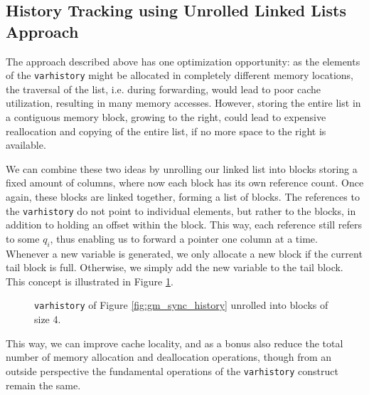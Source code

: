 \subsection{History Tracking using Unrolled Linked Lists Approach}\label{subsec:gm_sync_history_unrolled}
The approach described above has one optimization opportunity: as the elements of the \texttt{varhistory} might be allocated in completely different memory locations, the traversal of the list, i.e. during forwarding, would lead to poor cache utilization, resulting in many memory accesses. However, storing the entire list in a contiguous memory block, growing to the right, could lead to expensive reallocation and copying of the entire list, if no more space to the right is available.

We can combine these two ideas by unrolling our linked list into blocks storing a fixed amount of columns, where now each block has its own reference count. Once again, these blocks are linked together, forming a list of blocks. The references to the \texttt{varhistory} do not point to individual elements, but rather to the blocks, in addition to holding an offset within the block. This way, each reference still refers to some $q_i$, thus enabling us to forward a pointer one column at a time. Whenever a new variable is generated, we only allocate a new block if the current tail block is full. Otherwise, we simply add the new variable to the tail block. This concept is illustrated in Figure \ref{fig:gm_sync_history_unrolled}.

\begin{figure}[H]
\centering
{}
\caption{\texttt{varhistory} of Figure \ref{fig:gm_sync_history} unrolled into blocks of size 4.}
\label{fig:gm_sync_history_unrolled}
\end{figure}

This way, we can improve cache locality, and as a bonus also reduce the total number of memory allocation and deallocation operations, though from an outside perspective the fundamental operations of the \texttt{varhistory} construct remain the same.
